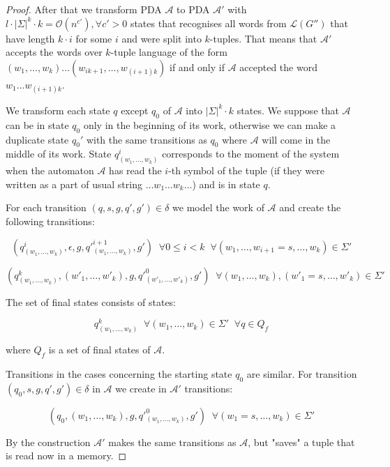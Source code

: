 \documentclass[12pt]{article}
\let\origenumerate\enumerate
\let\origendenumerate\endenumerate
\renewenvironment{enumerate}{\origenumerate[topsep = 0pt, noitemsep]}{\origendenumerate}
\begin{document}
\begin{proof}
\begin{enumerate}
    \item After that we transform PDA $\mathcal{A}$ to PDA $\mathcal{A}'$ with $l \cdot |\Sigma|^{k} \cdot k = \mathcal{O}(n^{c'}), \forall c' > 0$ states that recognises all words from $\mathcal{L}(G'')$ that have length $k \cdot i$ for some $i$ and were split into $k$-tuples. That means that $\mathcal{A}'$ accepts the words over $k$-tuple language of the form $(w_1, \ldots, w_k)\ldots(w_{ik+1}, \ldots, w_{(i+1)k})$ if and only if $\mathcal{A}$ accepted the word $w_1\ldots w_{(i+1)k}$.
    
    We transform each state $q$ except $q_0$ of $\mathcal{A}$ into $|\Sigma|^{k} \cdot k$ states. We suppose that $\mathcal{A}$ can be in state $q_0$ only in the beginning of its work, otherwise we can make a duplicate state $q_0'$ with the same transitions as $q_0$ where $\mathcal{A}$ will come in the middle of its work. State $q_{(w_1, \ldots, w_k)}^i$ corresponds to the moment of the system when the automaton $\mathcal{A}$ has read the $i$-th symbol of the tuple (if they were written as a part of usual string $\ldots w_1 \ldots w_k \ldots$) and is in state $q$. 
    
    For each transition $(q, s, g, q', g') \in \delta$ we model the work of $\mathcal{A}$ and create the following transitions:
    
    $$(q_{(w_1, \ldots, w_k)}^i, \epsilon, g, q'^{i+1}_{(w_1, \ldots, w_k)}, g') \;\; \forall 0 \le i < k \;\; \forall (w_1, \ldots, w_{i+1} = s, \ldots, w_k) \in \Sigma'$$
    
    $$(q_{(w_1, \ldots, w_k)}^k, (w'_1, \ldots, w'_k), g, q'^{0}_{(w'_1, \ldots, w'_k)}, g') \;\; \forall (w_1, \ldots, w_k), (w'_1 = s, \ldots, w'_k) \in \Sigma'$$
    
    The set of final states consists of states: 
    
    $$q^k_{(w_1, \ldots, w_k)} \;\; \forall (w_1, \ldots, w_k) \in \Sigma' \;\; \forall q \in Q_f$$
    
    where $Q_f$ is a set of final states of $\mathcal{A}$.
    
    Transitions in the cases concerning the starting state $q_0$ are similar. For transition $(q_0, s, g, q', g') \in \delta$ in $\mathcal{A}$ we create in $\mathcal{A'}$ transitions:
    
    $$(q_0, (w_1, \ldots, w_k), g, q'^{0}_{(w_1, \ldots, w_k)}, g') \;\; \forall (w_1 = s, \ldots, w_k) \in \Sigma'$$
    
    By the construction $\mathcal{A'}$ makes the same transitions as $\mathcal{A}$, but "saves" a tuple that is read now in a memory.


\end{enumerate}
\end{proof}
\end{document}

